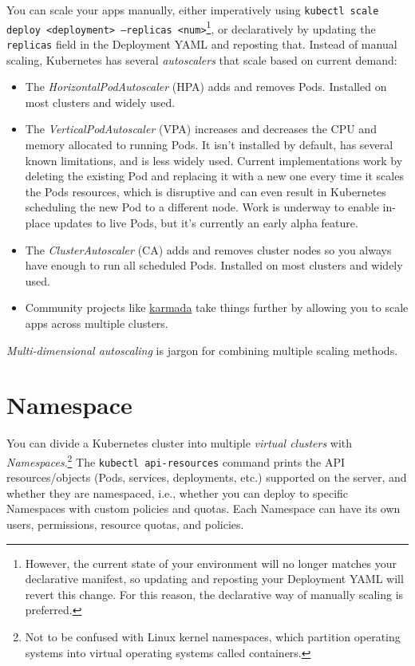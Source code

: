 \documentclass[table, xcdraw]{article}%
\begin{document}
You can scale your apps manually, either imperatively using \texttt{kubectl scale deploy <deployment> --replicas <num>}\footnote{However, the current state of your environment will no longer matches your declarative manifest, so updating and reposting your Deployment YAML will revert this change. For this reason, the declarative way of manually scaling is preferred.}, or declaratively by updating the \texttt{replicas} field in the Deployment YAML and reposting that. Instead of manual scaling, Kubernetes has several \emph{autoscalers} that scale based on current demand:

\begin{itemize}
    \item The \emph{HorizontalPodAutoscaler} (HPA) adds and removes Pods. Installed on most clusters and widely used.
    \item The \emph{VerticalPodAutoscaler} (VPA) increases and decreases the CPU and memory allocated to running Pods. It isn’t installed by default, has several known limitations, and is less widely used. Current implementations work by deleting the existing Pod and replacing it with a new one every time it scales the Pods resources, which is disruptive and can even result in Kubernetes scheduling the new Pod to a different node. Work is underway to enable in-place updates to live Pods, but it’s
    currently an early alpha feature.
    \item The \emph{ClusterAutoscaler} (CA) adds and removes cluster nodes so you always have enough to run all scheduled Pods. Installed on most clusters and widely used.
    \item[-] Community projects like \href{https://karmada.io/}{karmada} take things further by allowing you to scale apps across multiple clusters.
\end{itemize}

\emph{Multi-dimensional autoscaling} is jargon for combining multiple scaling methods.

\section{Namespace}

You can divide a Kubernetes cluster into multiple \emph{virtual clusters} with \emph{Namespaces}.\footnote{Not to be confused with Linux kernel namespaces, which partition operating systems into virtual operating systems called containers.} The \texttt{kubectl api-resources} command prints the API resources/objects (Pods, services, deployments, etc.) supported on the server, and whether they are namespaced, i.e., whether you can deploy to specific Namespaces with custom policies and quotas. Each Namespace can have its own users, permissions, resource quotas, and policies.
\end{document}
